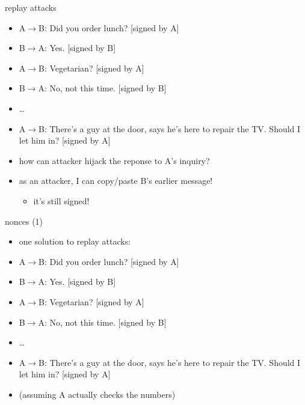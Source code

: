\begin{frame}{replay attacks}
    \begin{itemize}
    \item A$\rightarrow$B: Did you order lunch? [signed by A]
    \item B$\rightarrow$A: Yes. [signed by B]
    \item A$\rightarrow$B: Vegetarian? [signed by A]
    \item B$\rightarrow$A: No, not this time. [signed by B]
    \item \ldots
    \item A$\rightarrow$B: There's a guy at the door, says he's here to repair the TV. Should I let him in? [signed by A]
    \item how can attacker hijack the reponse to A's inquiry?
    \vspace{.5cm}
    \item<2-> as an attacker, I can copy/paste B's earlier message!
        \begin{itemize}
        \item it's still signed!
        \end{itemize}
    \end{itemize}
\end{frame}

\begin{frame}{nonces (1)}
    \begin{itemize}
    \item one solution to replay attacks:
    \item A$\rightarrow$B:  Did you order lunch? [signed by A]
    \item B$\rightarrow$A:  Yes. [signed by B]
    \item A$\rightarrow$B:  Vegetarian? [signed by A]
    \item B$\rightarrow$A:  No, not this time. [signed by B]
    \item \ldots
    \item A$\rightarrow$B:  There's a guy at the door, says he's here to repair the TV. Should I let him in? [signed by A]
    \vspace{.5cm}
    \item (assuming A actually checks the numbers)
    \end{itemize}
\end{frame}

